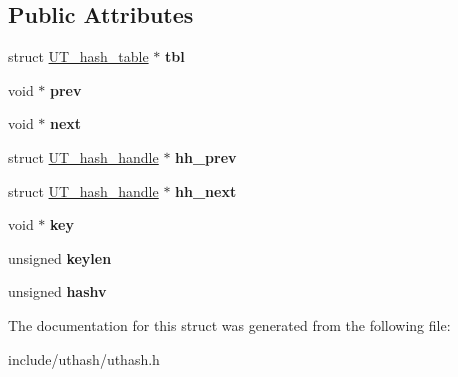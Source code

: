 \subsection*{Public Attributes}
\begin{DoxyCompactItemize}
\item 
\mbox{\label{struct_u_t__hash__handle_ad2035ee3b2aa55b22e352341372a5e73}} 
struct \mbox{\hyperlink{struct_u_t__hash__table}{U\+T\+\_\+hash\+\_\+table}} $\ast$ {\bfseries tbl}
\item 
\mbox{\label{struct_u_t__hash__handle_abaf54a69367933df2d45575f48ca6a58}} 
void $\ast$ {\bfseries prev}
\item 
\mbox{\label{struct_u_t__hash__handle_a93bc88ffe97f85ea0d9e0056b7118942}} 
void $\ast$ {\bfseries next}
\item 
\mbox{\label{struct_u_t__hash__handle_a3ec03e34d7975d5c1981c44b324619b2}} 
struct \mbox{\hyperlink{struct_u_t__hash__handle}{U\+T\+\_\+hash\+\_\+handle}} $\ast$ {\bfseries hh\+\_\+prev}
\item 
\mbox{\label{struct_u_t__hash__handle_a4f6989385499ba6f594b0f0facd28325}} 
struct \mbox{\hyperlink{struct_u_t__hash__handle}{U\+T\+\_\+hash\+\_\+handle}} $\ast$ {\bfseries hh\+\_\+next}
\item 
\mbox{\label{struct_u_t__hash__handle_a40690fc15aeaeba8f25385f05f84dd4d}} 
void $\ast$ {\bfseries key}
\item 
\mbox{\label{struct_u_t__hash__handle_af2abdc405972a6bbdee2ade2c0f346c4}} 
unsigned {\bfseries keylen}
\item 
\mbox{\label{struct_u_t__hash__handle_aae5e635fa110556e5007f627089f8323}} 
unsigned {\bfseries hashv}
\end{DoxyCompactItemize}


The documentation for this struct was generated from the following file\+:\begin{DoxyCompactItemize}
\item 
include/uthash/uthash.\+h\end{DoxyCompactItemize}
